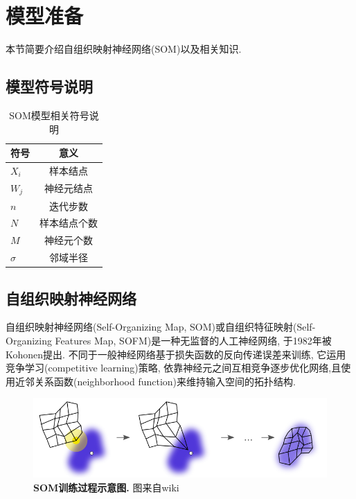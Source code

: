 
\section{模型准备}
\label{sec:preliminary}
本节简要介绍自组织映射神经网络(SOM)以及相关知识.

\subsection{模型符号说明}

\begin{table}[h]
	\begin{center}
		\caption{SOM模型相关符号说明}
		\begin{tabular}{l|c}
			\toprule[2pt] 
			    符号 & 意义 \\ \hline
			 $X_i$& 样本结点\\
       $W_j$&神经元结点\\
       $n$&迭代步数\\
       $N$&样本结点个数\\
       $M$&神经元个数\\
       $\sigma$&邻域半径\\


			\toprule[2pt] 
		\end{tabular}
		
		\label{tab:distribution}
		\vspace{-0.4cm}
	\end{center}
\end{table}


\subsection{自组织映射神经网络}
\label{sec:som}
自组织映射神经网络(Self-Organizing Map, SOM)或自组织特征映射(Self-Organizing Features Map, SOFM)是一种无监督的人工神经网络, 于1982年被Kohonen提出\cite{som}. 不同于一般神经网络基于损失函数的反向传递误差来训练, 它运用竞争学习(competitive learning)策略, 依靠神经元之间互相竞争逐步优化网络,且使用近邻关系函数(neighborhood function)来维持输入空间的拓扑结构.

\begin{figure}[h]
    \begin{center}
        \includegraphics[width=0.6\linewidth]{fig/som1}
    \end{center}
    \caption{\textbf{SOM训练过程示意图.} 图来自wiki}
        \label{fig:plan}
  \end{figure}

